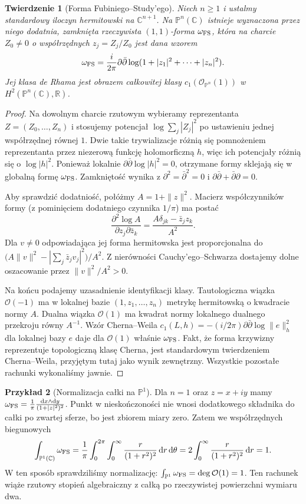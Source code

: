 \documentclass[11pt,a4paper,openany]{report}
\numberwithin{equation}{section}
\theoremstyle{plain}
\newtheorem{twierdzenie}{Twierdzenie}[section]
\theoremstyle{definition}
\newtheorem{przyklad}[twierdzenie]{Przykład}
\theoremstyle{remark}
\newcommand{\R}{\mathbb R}
\newcommand{\C}{\mathbb C}
\newcommand{\PP}{\mathbb P}
\begin{document}
\begin{twierdzenie}[Forma Fubiniego--Study'ego]
\label{tw:ga9-fs}
Niech $n\ge1$ i ustalmy standardowy iloczyn
hermitowski na $\C^{n+1}$. Na $\PP^n(\C)$ istnieje
wyznaczona przez niego dodatnia,
zamknięta rzeczywista $(1,1)$-forma
$\omega_{\rm FS}$, która na charcie $Z_0\ne0$
o współrzędnych $z_j=Z_j/Z_0$ jest dana wzorem
\[
 \omega_{\rm FS}=\frac{i}{2\pi}\partial\bar\partial
 \log(1+|z_1|^2+\cdots+|z_n|^2).
\]
Jej klasa de Rhama jest obrazem całkowitej klasy
$c_1(\mathcal O_{\PP^n}(1))$ w $H^2(\PP^n(\C),\R)$.
\end{twierdzenie}
\begin{proof}
Na dowolnym charcie rzutowym wybieramy reprezentanta
$Z=(Z_0,\ldots,Z_n)$ i stosujemy potencjał
$\log\sum_j|Z_j|^2$ po ustawieniu jednej współrzędnej
równej $1$. Dwie takie trywializacje różnią się
pomnożeniem reprezentanta przez niezerową funkcję
holomorficzną $h$, więc ich potencjały różnią się
o $\log|h|^2$. Ponieważ lokalnie
$\partial\bar\partial\log|h|^2=0$, otrzymane formy
sklejają się w globalną formę $\omega_{\rm FS}$.
Zamkniętość wynika z $\partial^2=\bar\partial^2=0$
i $\partial\bar\partial+\bar\partial\partial=0$.

Aby sprawdzić dodatniość, połóżmy $A=1+\|z\|^2$.
Macierz współczynników formy (z pominięciem dodatniego
czynnika $1/\pi$) ma postać
\[
 \frac{\partial^2\log A}{\partial z_j\partial\bar z_k}
 =\frac{A\delta_{jk}-\bar z_j z_k}{A^2}.
\]
Dla $v\ne0$ odpowiadająca jej forma hermitowska
jest proporcjonalna do
$\big(A\|v\|^2-|\sum_j\bar z_jv_j|^2\big)/A^2$.
Z nierówności Cauchy'ego--Schwarza dostajemy dolne
oszacowanie przez $\|v\|^2/A^2>0$.

Na końcu podajemy uzasadnienie identyfikacji klasy.
Tautologiczna wiązka $\mathcal O(-1)$ ma w lokalnej
bazie $(1,z_1,\ldots,z_n)$ metrykę hermitowską
o kwadracie normy $A$. Dualna wiązka $\mathcal O(1)$
ma kwadrat normy lokalnego dualnego przekroju równy $A^{-1}$.
Wzór Cherna--Weila
$c_1(L,h)=-(i/2\pi)\partial\bar\partial\log\|e\|^2_h$
dla lokalnej bazy $e$ daje dla $\mathcal O(1)$
właśnie $\omega_{\rm FS}$. Fakt, że forma krzywizny
reprezentuje topologiczną klasę Cherna, jest
standardowym twierdzeniem Cherna--Weila, przyjętym
tutaj jako wynik zewnętrzny. Wszystkie pozostałe
rachunki wykonaliśmy jawnie.
\end{proof}

\begin{przyklad}[Normalizacja całki na $\PP^1$]
\label{prz:ga9-fs-integral}
Dla $n=1$ oraz $z=x+iy$ mamy
$\omega_{\rm FS}=\frac1\pi\frac{\mathrm dx\wedge\mathrm dy}
{(1+|z|^2)^2}$. Punkt w nieskończoności nie wnosi
dodatkowego składnika do całki po zwartej sferze,
bo jest zbiorem miary zero. Zatem we współrzędnych
biegunowych
\[
 \int_{\PP^1(\C)}\omega_{\rm FS}
 =\frac1\pi\int_0^{2\pi}\int_0^\infty
 \frac{r}{(1+r^2)^2}\,\mathrm dr\,\mathrm d\theta
 =2\int_0^\infty\frac{r}{(1+r^2)^2}\,\mathrm dr=1.
\]
W ten sposób sprawdziliśmy normalizację:
$\int_{\PP^1}\omega_{\rm FS}=\deg\mathcal O(1)=1$.
Ten rachunek wiąże rzutowy stopień algebraiczny
z całką po rzeczywistej powierzchni wymiaru dwa.
\end{przyklad}
\end{document}
